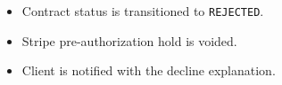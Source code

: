 \begin{itemize}[leftmargin=1.6em,topsep=3pt,itemsep=2pt,parsep=0pt,label=$\bullet$]
      \item Contract status is transitioned to \texttt{REJECTED}.
      \item Stripe pre-authorization hold is voided.
      \item Client is notified with the decline explanation.
\end{itemize}

